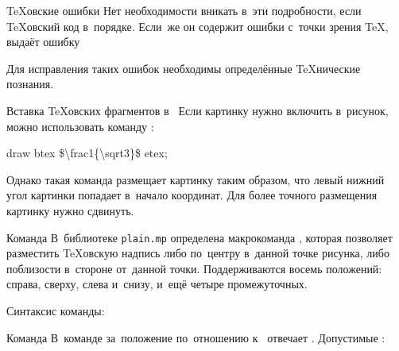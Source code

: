 
\begin{frame}{\TeX{}овские ошибки}
Нет необходимости вникать в~эти подробности, если \TeX{}овский код в~порядке.
Если~же он содержит ошибки с~точки зрения \TeX,  выдаёт ошибку
\begin{screen}
%
%
\end{screen}
Для исправления таких ошибок необходимы определённые \TeX{}нические познания.
\end{frame}


\begin{frame}{Вставка \TeX{}овских фрагментов в~}
Если картинку  нужно включить в~рисунок, можно
использовать команду :
\begin{programlisting}
draw btex \$\textbackslash frac1\{\textbackslash sqrt3\}\$ etex;
\end{programlisting}

Однако такая команда размещает картинку таким образом, что левый нижний угол
картинки попадает в~начало координат. Для более точного размещения картинку
нужно сдвинуть.
\end{frame}


\begin{frame}{Команда }
В~библиотеке \nolinkurl{plain.mp} определена макрокоманда ,
которая позволяет разместить \TeX{}овскую надпись либо по~центру в~данной точке
рисунка, либо поблизости в~стороне от~данной точки. Поддерживаются восемь
положений: справа, сверху, слева и~снизу, и~ещё четыре промежуточных.

Синтаксис команды:
\begin{center}
\Large
{}\literal{,~}\literal{)}
\literal{(}\literal{, }\literal{)}
\end{center}
\end{frame}


\begin{frame}{Команда }
В~команде  за~положение  по~отношению
к~ отвечает . Допустимые
:

\bigskip

\centerline{}
\end{frame}

